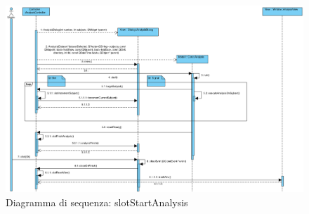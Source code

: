 \begin{figure}[!h]
\centering
	\includegraphics[width=\linewidth]{./Content/Immagini/SlotStartAnalysis.png}
	\caption{Diagramma di sequenza: slotStartAnalysis}
	\label{diag_slotStartAnalysis}
\end{figure}
\pagebreak